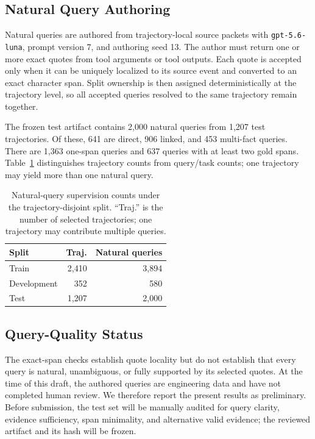 \documentclass[sigconf,anonymous,review]{acmart}
\begin{document}
\subsection{Natural Query Authoring}

Natural queries are authored from trajectory-local source packets with \texttt{gpt-5.6-luna}, prompt version 7, and authoring seed 13. The author must return one or more exact quotes from tool arguments or tool outputs. Each quote is accepted only when it can be uniquely localized to its source event and converted to an exact character span. Split ownership is then assigned deterministically at the trajectory level, so all accepted queries resolved to the same trajectory remain together.

The frozen test artifact contains 2,000 natural queries from 1,207 test trajectories. Of these, 641 are direct, 906 linked, and 453 multi-fact queries. There are 1,363 one-span queries and 637 queries with at least two gold spans. Table~\ref{tab:data} distinguishes trajectory counts from query/task counts; one trajectory may yield more than one natural query.

\begin{table}[t]
\centering
\small
\begin{tabular}{lrr}
\hline
Split & Traj. & Natural queries \\
\hline
Train & 2,410 & 3,894 \\
Development & 352 & 580 \\
Test & 1,207 & 2,000 \\
\hline
\end{tabular}
\caption{Natural-query supervision counts under the trajectory-disjoint split. ``Traj.'' is the number of selected trajectories; one trajectory may contribute multiple queries.}
\label{tab:data}
\end{table}

\subsection{Query-Quality Status}

The exact-span checks establish quote locality but do not establish that every query is natural, unambiguous, or fully supported by its selected quotes. At the time of this draft, the authored queries are engineering data and have not completed human review. We therefore report the present results as preliminary. Before submission, the test set will be manually audited for query clarity, evidence sufficiency, span minimality, and alternative valid evidence; the reviewed artifact and its hash will be frozen.
\end{document}
